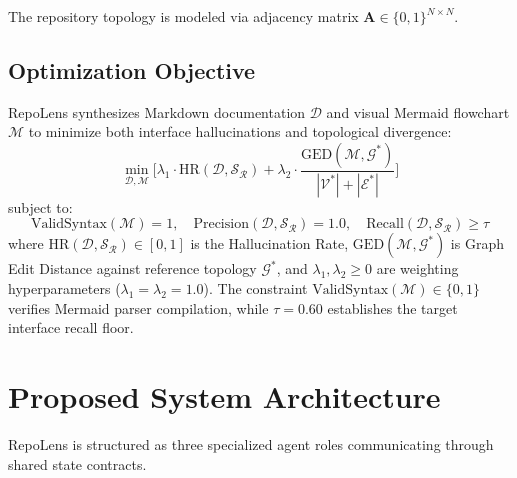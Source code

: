 \documentclass[conference]{IEEEtran}
\begin{document}
The repository topology is modeled via adjacency matrix $\mathbf{A} \in \{0, 1\}^{N \times N}$.

\subsection{Optimization Objective}
RepoLens synthesizes Markdown documentation $\mathcal{D}$ and visual Mermaid flowchart $\mathcal{M}$ to minimize both interface hallucinations and topological divergence:
\begin{equation}
\min_{\mathcal{D}, \mathcal{M}} \Big[ \lambda_1 \cdot \mathrm{HR}(\mathcal{D}, \mathcal{S}_{\mathcal{R}}) + \lambda_2 \cdot \frac{\mathrm{GED}(\mathcal{M}, \mathcal{G}^*)}{|\mathcal{V}^*| + |\mathcal{E}^*|} \Big]
\end{equation}
subject to:
\begin{equation}
\mathrm{ValidSyntax}(\mathcal{M}) = 1, \quad \mathrm{Precision}(\mathcal{D}, \mathcal{S}_{\mathcal{R}}) = 1.0, \quad \mathrm{Recall}(\mathcal{D}, \mathcal{S}_{\mathcal{R}}) \ge \tau
\end{equation}
where $\mathrm{HR}(\mathcal{D}, \mathcal{S}_{\mathcal{R}}) \in [0, 1]$ is the Hallucination Rate, $\mathrm{GED}(\mathcal{M}, \mathcal{G}^*)$ is Graph Edit Distance against reference topology $\mathcal{G}^*$, and $\lambda_1, \lambda_2 \ge 0$ are weighting hyperparameters ($\lambda_1 = \lambda_2 = 1.0$). The constraint $\mathrm{ValidSyntax}(\mathcal{M}) \in \{0, 1\}$ verifies Mermaid parser compilation, while $\tau = 0.60$ establishes the target interface recall floor.

\section{Proposed System Architecture}
RepoLens is structured as three specialized agent roles communicating through shared state contracts.
\end{document}
